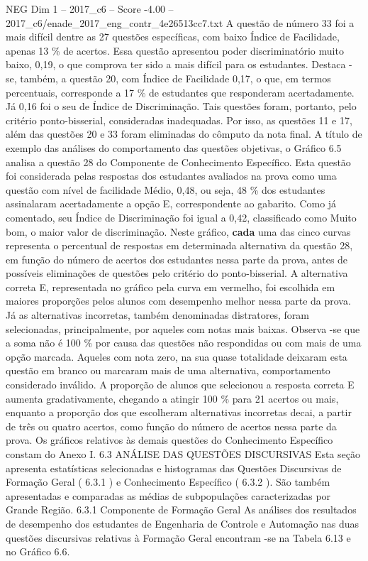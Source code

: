 \begin{textsample}{NEG Dim 1 – 2017\_c6 – Score -4.00 – 2017\_c6/enade\_2017\_eng\_contr\_4e26513cc7.txt}
A questão de número 33 foi a mais difícil dentre as 27 questões específicas, com baixo Índice de Facilidade, apenas 13 \% de acertos.
Essa questão apresentou poder discriminatório muito baixo, 0,19, o que comprova ter sido a mais difícil para os estudantes.
Destaca -se, também, a questão 20, com Índice de Facilidade 0,17, o que, em termos percentuais, corresponde a 17 \% de estudantes que responderam acertadamente.
Já 0,16 foi o seu de Índice de Discriminação.
Tais questões foram, portanto, pelo critério ponto-bisserial, consideradas inadequadas.
Por isso, as questões 11 e 17, além das questões 20 e 33 foram eliminadas do cômputo da nota final.
A título de exemplo das análises do comportamento das questões objetivas, o Gráfico 6.5 analisa a questão 28 do Componente de Conhecimento Específico.
Esta questão foi considerada pelas respostas dos estudantes avaliados na prova como uma questão com nível de facilidade Médio, 0,48, ou seja, 48 \% dos estudantes assinalaram acertadamente a opção E, correspondente ao gabarito.
Como já comentado, seu Índice de Discriminação foi igual a 0,42, classificado como Muito bom, o maior valor de discriminação.
Neste gráfico, \textbf{cada} uma das cinco curvas representa o percentual de respostas em determinada alternativa da questão 28, em função do número de acertos dos estudantes nessa parte da prova, antes de possíveis eliminações de questões pelo critério do ponto-bisserial.
A alternativa correta E, representada no gráfico pela curva em vermelho, foi escolhida em maiores proporções pelos alunos com desempenho melhor nessa parte da prova.
Já as alternativas incorretas, também denominadas distratores, foram selecionadas, principalmente, por aqueles com notas mais baixas.
Observa -se que a soma não é 100 \% por causa das questões não respondidas ou com mais de uma opção marcada.
Aqueles com nota zero, na sua quase totalidade deixaram esta questão em branco ou marcaram mais de uma alternativa, comportamento considerado inválido.
A proporção de alunos que selecionou a resposta correta E aumenta gradativamente, chegando a atingir 100 \% para 21 acertos ou mais, enquanto a proporção dos que escolheram alternativas incorretas decai, a partir de três ou quatro acertos, como função do número de acertos nessa parte da prova.
Os gráficos relativos às demais questões do Conhecimento Específico constam do Anexo I. 6.3 ANÁLISE DAS QUESTÕES DISCURSIVAS Esta seção apresenta estatísticas selecionadas e histogramas das Questões Discursivas de Formação Geral ( 6.3.1 ) e Conhecimento Específico ( 6.3.2 ).
São também apresentadas e comparadas as médias de subpopulações caracterizadas por Grande Região. 6.3.1 Componente de Formação Geral As análises dos resultados de desempenho dos estudantes de Engenharia de Controle e Automação nas duas questões discursivas relativas à Formação Geral encontram -se na Tabela 6.13 e no Gráfico 6.6.

\end{textsample}
